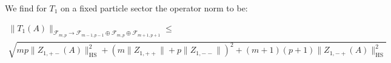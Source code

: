 \documentclass[a4paper,12pt]{article}
\begin{document}
 We find for \(T_1\) on a fixed particle sector the operator norm to be:
 
 \begin{multline}
 \| T_1(A)\|_{\mathcal{F}_{m,p}\rightarrow \mathcal{F}_{m-1,p-1} \oplus \mathcal{F}_{m,p} \oplus \mathcal{F}_{m+1,p+1} }\le \\ 
 \sqrt{m p \| Z_{1,+-}(A)\|^2_{\text{HS}} +(m \|Z_{1,++}\|+p \|Z_{1,--}\|)^2+(m+1) (p+1) \| Z_{1,-+}(A)\|^2_{\text{HS}}}
 \end{multline}
\end{document}
